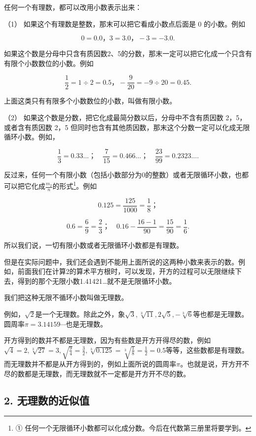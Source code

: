 任何一个有理数，都可以改用小数表示出来：

（1） 如果这个有理数是整数，那末可以把它看成小数点后面是 0 的小数。例如

\[
0 = 0.0\text{，} 3 = 3.0\text{，} - 3 = - 3.0.
\]

如果这个数是分母中只含有质因数2、5的分数，那末一定可以把它化成一个只含有有限个小数数位的小数。例如

\[
\frac{1}{2} = 1 \div 2 = 0.5\text{，} - \frac{9}{20} = - 9 \div 20 = 0.45.
\]

上面这类只有有限多个小数数位的小数，叫做有限小数。

（2） 如果这个数是分数，把它化成最简分数以后，分母中不含有质因数
2，5，或者含有质因数 2，5
但同时也含有其他质因数，那末这个分数一定可以化成无限循环小数。例如，

\[
\frac{1}{3} = 0.33 \dots \text{；} \quad \frac{7}{15} = 0.466 \dots \text{；} \quad \frac{23}{99} = 0.2323 \dots .
\]

反过来，任何一个有限小数（包括小数部分为0的整数）或者无限循环小数，也都可以把它化成\(\frac{m_2}{n}\)的形式\footnote{①
  任何一个无限循环小数都可以化成分数。今后在代数第三册里将要学到。}。例如

\[
0.125 = \frac{125}{1000} = \frac{1}{8}\text{；}
\]

\[
0.6 = \frac{6}{9} = \frac{2}{3}\text{；} \quad 0.16 - \frac{16 - 1}{90} = \frac{15}{90} = \frac{1}{6}.
\]

所以我们说，一切有限小数或者无限循环小数都是有理数。

但是在实际问题中，我们还会遇到不能用上面所说的这两种小数来表示的数。例如，前面我们在计算2的算术平方根时，可以发现，开方的过程可以无限继续下去，得到的那个无限小数1.41421\ldots 就不是无限循环小数。

我们把这种无限不循环小数叫做无理数。

例如，\(\sqrt{2}\)是一个无理数。除此之外，象\(\sqrt{3}, \sqrt[3]{11}, 2\sqrt{5}, -\sqrt[3]{6}\)等也都是无理数。圆周率\(\pi = 3.14159 \cdots\)也是无理数。

开方得到的数并不都是无理数，因为有些数是开方开得尽的数，例如\(\sqrt{4} = 2, \sqrt[3]{27} = 3, \sqrt{\frac{9}{4}} = \frac{3}{2}, \sqrt[3]{0.125} = \sqrt[3]{\frac{1}{8}} = \frac{1}{2} = 0.5\)等等，这些数都是有理数。而无理数并不都是从开方得到的，例如上面所说的圆周率\(\pi\)。也就是说，开方开不尽的数都是无理数，而无理数就不一定都是开方开不尽的数。

\subsection{2. 无理数的近似值}

